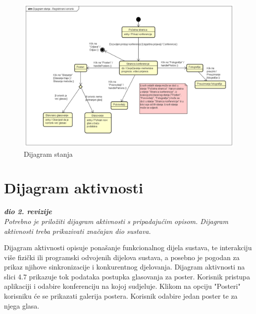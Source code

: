 			\begin{figure} [hbt!]
				\includegraphics[width=\linewidth]{Slike/StateMachineDiagram}
				\caption{Dijagram stanja}
			\end{figure}
			
			
			\eject 
		
		\section{Dijagram aktivnosti}
			
			\textbf{\textit{dio 2. revizije}}\\
			
			 \textit{Potrebno je priložiti dijagram aktivnosti s pripadajućim opisom. Dijagram aktivnosti treba prikazivati značajan dio sustava.}
			 
			 \indent Dijagram aktivnosti opisuje ponašanje funkcionalnog dijela sustava, te interakciju više fizički ili programski odvojenih dijelova sustava, a posebno je pogodan za prikaz njihove sinkronizacije i konkurentnog djelovanja. Dijagram aktivnosti na slici 4.7 prikazuje tok podataka postupka glasovanja za poster. Korisnik pristupa aplikaciji i odabire konferenciju na kojoj sudjeluje. Klikom na opciju "Posteri" korisniku će se prikazati galerija postera. Korisnik odabire jedan poster te za njega glasa.    
			 
